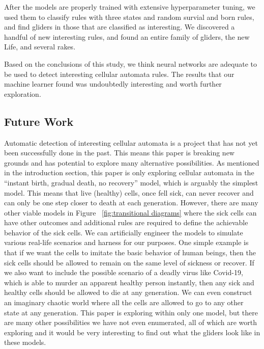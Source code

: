 \documentclass[12pt]{article}
\numberwithin{figure}{section} %
\begin{document}
After the models are properly trained with extensive hyperparameter tuning, we used them to classify rules with three states and random survial and born rules, and find gliders in those that are classified as interesting. We discovered a handful of new interesting rules, and found an entire family of gliders, the new Life, and several rakes. 

Based on the conclusions of this study, we think neural networks are adequate to be used to detect interesting cellular automata rules. The results that our machine learner found was undoubtedly interesting and worth further exploration. 

\subsection{Future Work}
Automatic detection of interesting cellular automata is a project that has not yet been successfully done in the past. This means this paper is breaking new grounds and has potential to explore many alternative possibilities. As mentioned in the introduction section, this paper is only exploring cellular automata in the “instant birth, gradual death, no recovery” model, which is arguably the simplest model. This means that live (healthy) cells, once fell sick, can never recover and can only be one step closer to death at each generation. However, there are many other viable models in Figure ~\ref{fig:transitional diagrams} where the sick cells can have other outcomes and additional rules are required to define the achievable behavior of the sick cells. We can artificially engineer the models to simulate various real-life scenarios and harness for our purposes. One simple example is that if we want the cells to imitate the basic behavior of human beings, then the sick cells should be allowed to remain on the same level of sickness or recover. If we also want to include the possible scenario of a deadly virus like Covid-19, which is able to murder an apparent healthy person instantly, then any sick and healthy cells should be allowed to die at any generation. We can even construct an imaginary chaotic world where all the cells are allowed to go to any other state at any generation. This paper is exploring within only one model, but there are many other possibilities we have not even enumerated, all of which are worth exploring and it would be very interesting to find out what the gliders look like in these models. 
\end{document}
